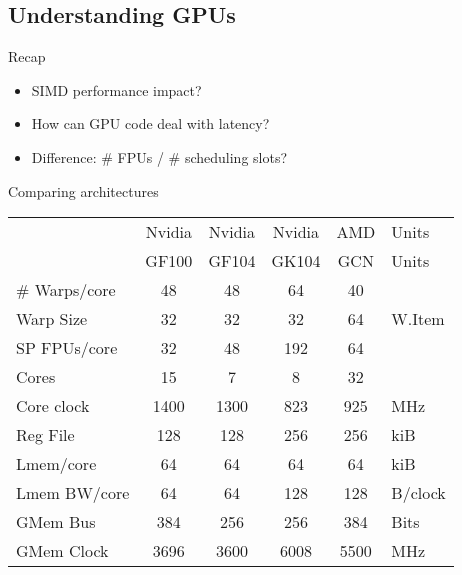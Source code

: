 \documentclass[english,compress]{beamer}
\begin{document}
\subsection{Understanding GPUs}
\begin{frame}{Recap}
  \begin{itemize}[<+->]
    \item SIMD performance impact?
    \item How can GPU code deal with latency?
    \item Difference: \# FPUs / \# scheduling slots?
  \end{itemize}
\end{frame}
\begin{frame}{Comparing architectures}
  \begin{tabular}{l|cccc|l}
    & Nvidia & Nvidia & Nvidia & AMD & Units\\
    & GF100 & GF104 & GK104 & GCN & Units\\
    \hline
    \# Warps/core & 48 & 48 & 64 & 40\\
    Warp Size & 32 & 32 & 32 & 64 & W.Item \\
    SP FPUs/core & 32 & 48 & 192 & 64 \\
    Cores & 15 & 7 & 8 & 32 \\
    \hline
    Core clock & 1400 & 1300 & 823 & 925 & MHz \\
    \hline
    Reg File & 128 & 128 & 256 & 256 & kiB \\
    Lmem/core & 64  & 64 & 64 & 64 & kiB \\
    Lmem BW/core & 64  & 64 & 128 & 128 & B/clock \\
    \hline
    GMem Bus & 384 & 256 & 256 & 384 & Bits\\
    GMem Clock & 3696 & 3600 & 6008 & 5500 & MHz\\
    \hline
  \end{tabular}
  \uncover<+->{}
\end{frame}
\end{document}
